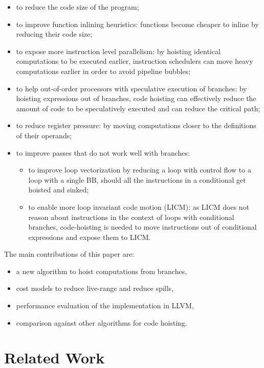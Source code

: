 \documentclass{sig-alternate}
\begin{document}
\begin{itemize}
\item to reduce the code size of the program;
\item to improve function inlining heuristics: functions become cheaper to
  inline by reducing their code size;
\item to expose more instruction level parallelism: by hoisting identical
  computations to be executed earlier, instruction schedulers can move heavy
  computations earlier in order to avoid pipeline bubbles;
\item to help out-of-order processors with speculative execution of branches: by
  hoisting expressions out of branches, code hoisting can effectively reduce the
  amount of code to be speculatively executed and can reduce the critical path;
\item to reduce register pressure: by moving computations closer to the
  definitions of their operands;
\item to improve passes that do not work well with branches:
  \begin{itemize}
  \item to improve loop vectorization by reducing a loop with control flow to a
    loop with a single BB, should all the instructions in a conditional get
    hoisted and sinked;
  \item to enable more loop invariant code motion (LICM): as LICM does not
    reason about instructions in the context of loops with conditional branches,
    code-hoisting is needed to move instructions out of conditional expressions
    and expose them to LICM.
  \end{itemize}
\end{itemize}

The main contributions of this paper are:
\begin{itemize}
\item a new algorithm to hoist computations from branches,
\item cost models to reduce live-range and reduce spills,
\item performance evaluation of the implementation in LLVM,
\item comparison against other algorithms for code hoisting.
\end{itemize}

\section{Related Work}
\end{document}
